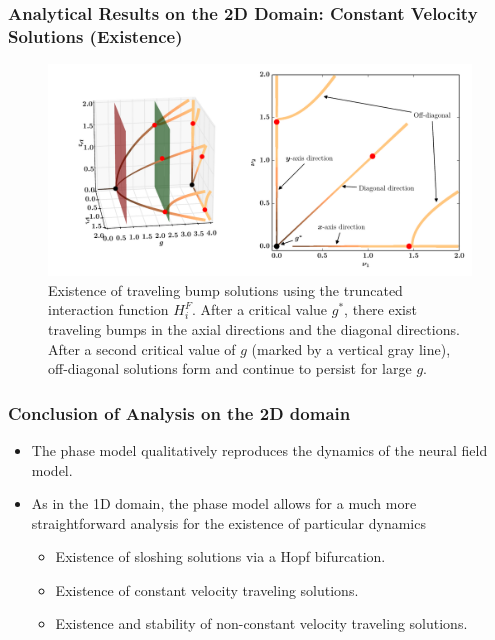 \documentclass{beamer}
\begin{document}
\begin{frame}
\frametitle{Analytical Results on the 2D Domain: Constant Velocity Solutions (Existence)}
\begin{figure}
 \centering
 \includegraphics[width=.7\textwidth]{twod_wave_exist_trunc_v4.pdf}
 \caption{Existence of traveling bump solutions using the truncated interaction function $H_i^F$. After a critical value $g^*$, there exist traveling bumps in the axial directions and the diagonal directions. After a second critical value of $g$ (marked by a vertical gray line), off-diagonal solutions form and continue to persist for large $g$.}\label{fig:twod_wave_exist_trunc}
\end{figure}
\end{frame}

\begin{frame}
 \frametitle{Conclusion of Analysis on the 2D domain}
 \begin{itemize}
  \item The phase model qualitatively reproduces the dynamics of the neural field model.
  \item As in the 1D domain, the phase model allows for a much more straightforward analysis for the existence of particular dynamics
  \begin{itemize}
  \item Existence of sloshing solutions via a Hopf bifurcation.
  \item Existence of constant velocity traveling solutions.
  \item Existence and stability of non-constant velocity traveling solutions.
 \end{itemize}
\end{itemize}
\end{frame}
\end{document}
